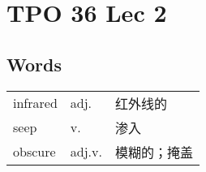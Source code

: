 \section{TPO 36 Lec 2}

\subsection{Words}

\begin{tabular}{lll}
    infrared & adj.   & 红外线的   \\
    seep     & v.     & 渗入     \\
    obscure  & adj.v. & 模糊的；掩盖 \\
\end{tabular}
